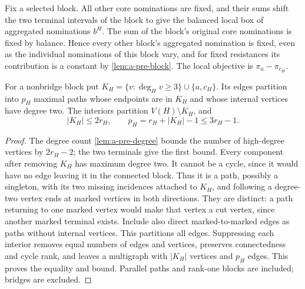 Fix a selected block. All other core nominations are fixed, and their
sums shift the two terminal intervals of the block to give the balanced
local box of aggregated nominations $b^H$. The sum of the block's
original core nominations is fixed by balance. Hence every other
block's aggregated nomination is fixed, even as the individual
nominations of this block vary, and for fixed resistances its
contribution is a constant by \cref{lem:a-pre-block}. The local
objective is $\pi_a-\pi_{c_H}$.

\begin{lemma}
\label{lem:a-blk-suppression}
For a nonbridge block put
$K_H=\{v:\deg_Hv\ge3\}\cup\{a,c_H\}$. Its edges partition into
$p_H$ maximal paths whose endpoints are in $K_H$ and whose internal
vertices have degree two. The interiors partition $V(H)\setminus K_H$,
and
\[
 |K_H|\le2r_H,\qquad p_H=r_H+|K_H|-1\le3r_H-1.
\]
\end{lemma}
\begin{proof}
The degree count \cref{lem:a-pre-degree} bounds the number of
high-degree vertices by $2r_H-2$; the two terminals give the first
bound. Every component after removing $K_H$ has maximum degree two.
It cannot be a cycle, since it would have no edge leaving it in the
connected block. Thus it is a path, possibly a singleton, with its two
missing incidences attached to $K_H$, and following a degree-two
vertex ends at marked vertices in both directions. They are distinct: a path
returning to one marked vertex would make that vertex a cut vertex,
since another marked terminal exists. Include also direct marked-to-marked
edges as paths without internal vertices. This partitions all edges.
Suppressing each interior removes equal numbers of edges and vertices,
preserves connectedness and cycle rank, and leaves a multigraph with
$|K_H|$ vertices and $p_H$ edges. This proves the equality and bound.
Parallel paths and rank-one blocks are included; bridges are excluded.
\end{proof}

